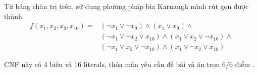 Từ bảng chân trị trên, sử dụng phương pháp bìa Karnaugh mình rút gọn được thành
\begin{align*}
    f(x_1, x_2, x_9, x_{10}) = & (\lnot x_1 \lor \lnot x_9) \land (x_1 \lor x_9) \land \\ 
    & (\lnot x_1 \lor \lnot x_2 \lor x_{10}) \land (x_1 \lor x_2 \lor \lnot x_{10}) \land \\
    & (\lnot x_1 \lor x_2 \lor \lnot x_{10}) \land (x_1 \lor \lnot x_2 \lor x_{10})
\end{align*}

CNF này có 4 biến và 16 literals, thỏa mãn yêu cầu đề bài và ăn trọn 6/6 điểm .